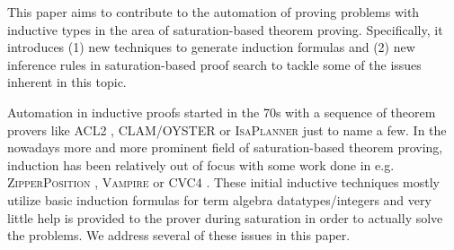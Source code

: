 
This paper aims to contribute to the automation of proving problems with inductive types in the area of saturation-based theorem proving. Specifically, it introduces (1) new techniques to generate induction formulas and (2) new inference rules in saturation-based proof search to tackle some of the issues inherent in this topic.

Automation in inductive proofs started in the 70s with a sequence of theorem provers like \textsc{ACL2} \cite{aclhandbook}, \textsc{CLAM/OYSTER} \cite{oyster} or \textsc{IsaPlanner} \cite{isabelle} just to name a few. In the nowadays more and more prominent field of saturation-based theorem proving, induction has been relatively out of focus with some work done in e.g. \textsc{ZipperPosition} \cite{cruanes}, \textsc{Vampire} \cite{vampireinduction,vampiregeneralization} or \textsc{CVC4} \cite{cvc4,smtinduction}. These initial inductive techniques mostly utilize basic induction formulas for term algebra datatypes/integers and very little help is provided to the prover during saturation in order to actually solve the problems. We address several of these issues in this paper.
